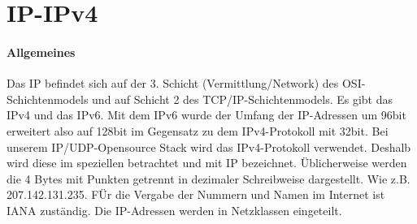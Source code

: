 \section{IP-IPv4}
\paragraph{Allgemeines}
Das IP befindet sich auf der 3. Schicht (Vermittlung/Network) des OSI-Schichtenmodels und auf Schicht 2 des TCP/IP-Schichtenmodels.
Es gibt das IPv4 und das IPv6. Mit dem IPv6 wurde der Umfang der IP-Adressen um 96bit erweitert also auf 128bit im Gegensatz zu dem IPv4-Protokoll mit 32bit. 
Bei unserem IP/UDP-Opensource Stack wird das IPv4-Protokoll verwendet.
Deshalb wird diese im speziellen betrachtet und mit IP bezeichnet. 
Üblicherweise werden die 4 Bytes mit Punkten getrennt in dezimaler Schreibweise dargestellt. 
Wie z.B. 207.142.131.235. FÜr die Vergabe der Nummern und Namen im Internet ist IANA zuständig. 
Die IP-Adressen werden in Netzklassen eingeteilt. 


